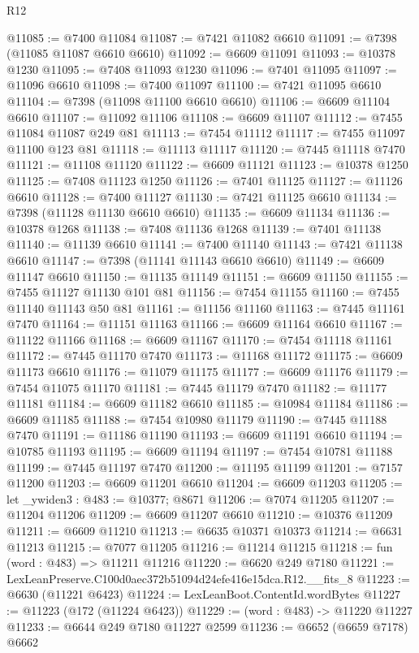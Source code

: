\begin{lexlean}{R12}
\begin{coremodule}
@11085 := @7400 @11084
@11087 := @7421 @11082 @6610
@11091 := @7398 (@11085 @11087 @6610 @6610)
@11092 := @6609 @11091
@11093 := @10378 @1230
@11095 := @7408 @11093 @1230
@11096 := @7401 @11095
@11097 := @11096 @6610
@11098 := @7400 @11097
@11100 := @7421 @11095 @6610
@11104 := @7398 (@11098 @11100 @6610 @6610)
@11106 := @6609 @11104 @6610
@11107 := @11092 @11106
@11108 := @6609 @11107
@11112 := @7455 @11084 @11087 @249 @81
@11113 := @7454 @11112
@11117 := @7455 @11097 @11100 @123 @81
@11118 := @11113 @11117
@11120 := @7445 @11118 @7470
@11121 := @11108 @11120
@11122 := @6609 @11121
@11123 := @10378 @1250
@11125 := @7408 @11123 @1250
@11126 := @7401 @11125
@11127 := @11126 @6610
@11128 := @7400 @11127
@11130 := @7421 @11125 @6610
@11134 := @7398 (@11128 @11130 @6610 @6610)
@11135 := @6609 @11134
@11136 := @10378 @1268
@11138 := @7408 @11136 @1268
@11139 := @7401 @11138
@11140 := @11139 @6610
@11141 := @7400 @11140
@11143 := @7421 @11138 @6610
@11147 := @7398 (@11141 @11143 @6610 @6610)
@11149 := @6609 @11147 @6610
@11150 := @11135 @11149
@11151 := @6609 @11150
@11155 := @7455 @11127 @11130 @101 @81
@11156 := @7454 @11155
@11160 := @7455 @11140 @11143 @50 @81
@11161 := @11156 @11160
@11163 := @7445 @11161 @7470
@11164 := @11151 @11163
@11166 := @6609 @11164 @6610
@11167 := @11122 @11166
@11168 := @6609 @11167
@11170 := @7454 @11118 @11161
@11172 := @7445 @11170 @7470
@11173 := @11168 @11172
@11175 := @6609 @11173 @6610
@11176 := @11079 @11175
@11177 := @6609 @11176
@11179 := @7454 @11075 @11170
@11181 := @7445 @11179 @7470
@11182 := @11177 @11181
@11184 := @6609 @11182 @6610
@11185 := @10984 @11184
@11186 := @6609 @11185
@11188 := @7454 @10980 @11179
@11190 := @7445 @11188 @7470
@11191 := @11186 @11190
@11193 := @6609 @11191 @6610
@11194 := @10785 @11193
@11195 := @6609 @11194
@11197 := @7454 @10781 @11188
@11199 := @7445 @11197 @7470
@11200 := @11195 @11199
@11201 := @7157 @11200
@11203 := @6609 @11201 @6610
@11204 := @6609 @11203
@11205 := let _ywiden3 : @483 := @10377; @8671
@11206 := @7074 @11205
@11207 := @11204 @11206
@11209 := @6609 @11207 @6610
@11210 := @10376 @11209
@11211 := @6609 @11210
@11213 := @6635 @10371 @10373
@11214 := @6631 @11213
@11215 := @7077 @11205
@11216 := @11214 @11215
@11218 := fun (word : @483) => @11211 @11216
@11220 := @6620 @249 @7180
@11221 := LexLeanPreserve.C100d0aec372b51094d24efe416e15dca.R12.__fits_8
@11223 := @6630 (@11221 @6423)
@11224 := LexLeanBoot.ContentId.wordBytes
@11227 := @11223 (@172 (@11224 @6423))
@11229 := (word : @483) -> @11220 @11227
@11233 := @6644 @249 @7180 @11227 @2599
@11236 := @6652 (@6659 @7178) @6662

\end{coremodule}
\end{lexlean}

